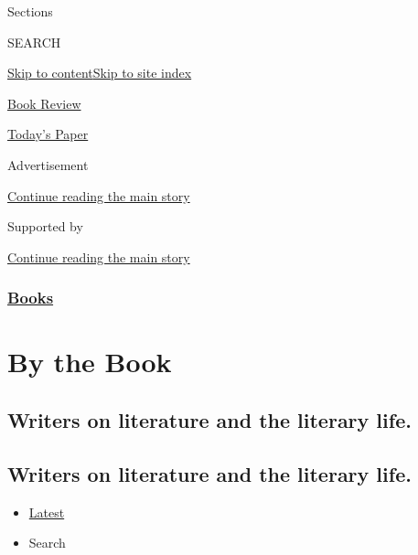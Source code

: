Sections

SEARCH

\protect\hyperlink{site-content}{Skip to
content}\protect\hyperlink{site-index}{Skip to site index}

\href{https://www.nytimes.com/section/books/review}{Book Review}

\href{https://myaccount.nytimes.com/auth/login?response_type=cookie\&client_id=vi}{}

\href{https://www.nytimes.com/section/todayspaper}{Today's Paper}

Advertisement

\protect\hyperlink{after-top}{Continue reading the main story}

Supported by

\protect\hyperlink{after-sponsor}{Continue reading the main story}

\hypertarget{books}{%
\subsubsection{\texorpdfstring{\href{/section/books}{Books}}{Books}}\label{books}}

\hypertarget{by-the-book}{%
\section{By the Book}\label{by-the-book}}

\hypertarget{writers-on-literature-and-the-literary-life}{%
\subsection{Writers on literature and the literary
life.}\label{writers-on-literature-and-the-literary-life}}

\hypertarget{writers-on-literature-and-the-literary-life-1}{%
\subsection{Writers on literature and the literary
life.}\label{writers-on-literature-and-the-literary-life-1}}

\begin{itemize}
\tightlist
\item
  \protect\hyperlink{stream-panel}{Latest}
\item
  Search
\end{itemize}

